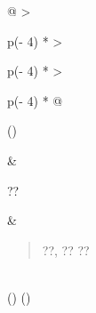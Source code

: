 \documentclass[
]{article}
\begin{document}
\begin{longtable}[]{@{}
  >{\raggedright\arraybackslash}p{(\columnwidth - 4\tabcolsep) * }
  >{\raggedright\arraybackslash}p{(\columnwidth - 4\tabcolsep) * }
  >{\raggedright\arraybackslash}p{(\columnwidth - 4\tabcolsep) * }@{}}
\toprule()
\begin{minipage}[b]{\linewidth}\raggedright
\end{minipage} & \begin{minipage}[b]{\linewidth}\raggedright
??
\end{minipage} & \begin{minipage}[b]{\linewidth}\raggedright
\begin{quote}
??, ?? ??
\end{quote}
\end{minipage} \\
\midrule()
\endhead
\bottomrule()
\end{longtable}
\end{document}
